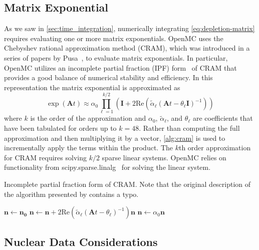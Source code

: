 \documentclass[3p,authoryear]{elsarticle}
\newcommand{\vect}[1]{\mathbf{#1}} %
\begin{document}
\subsection{Matrix Exponential}

As we saw in \cref{sec:time_integration}, numerically integrating
\cref{eq:depletion-matrix} requires evaluating one or more matrix exponentials.
OpenMC uses the Chebyshev rational approximation method (CRAM), which was
introduced in a series of papers by Pusa~\citep{pusa2010nse,pusa2011nse}, to
evaluate matrix exponentials. In particular, OpenMC utilizes an incomplete
partial fraction (IPF) form~\citep{pusa2016nse} of CRAM that provides a good
balance of numerical stability and efficiency. In this representation the matrix
exponential is approximated as
\begin{equation}
    \exp(\vect{A}t) \approx \alpha_0 \prod\limits_{\ell=1}^{k/2} \left (
    \vect{I} + 2 \text{Re} \left ( \widetilde{\alpha}_\ell \left (\vect{A}t
    - \theta_\ell \vect{I} \right )^{-1} \right ) \right )
\end{equation}
where $k$ is the order of the approximation and $\alpha_0$,
$\widetilde{\alpha}_\ell$, and $\theta_\ell$ are coefficients that have been
tabulated for orders up to $k=48$. Rather than computing the full approximation
and then multiplying it by a vector, \cref{alg:cram} is used to incrementally
apply the terms within the product. The $k$th order approximation for CRAM
requires solving $k/2$ sparse linear systems. OpenMC relies on functionality
from scipy.sparse.linalg~\citep{virtanen2020nm} for solving the linear system.
\begin{algorithm}[H]
  \caption{Incomplete partial fraction form of CRAM. Note that the original
  description of the algorithm presented by \citet{pusa2016nse} contains a
  typo.}
  \label{alg:cram}
  \begin{algorithmic}
    \State $\vect{n} \gets \vect{n_0}$
      \State $\vect{n} \gets \vect{n} + 2\text{Re}(\widetilde{\alpha}_\ell
        (\vect{A}t - \theta_\ell)^{-1})\vect{n}$
    \EndFor
    \State $\vect{n} \gets \alpha_0 \vect{n}$
  \end{algorithmic}
\end{algorithm}

\subsection{Nuclear Data Considerations}
\end{document}
